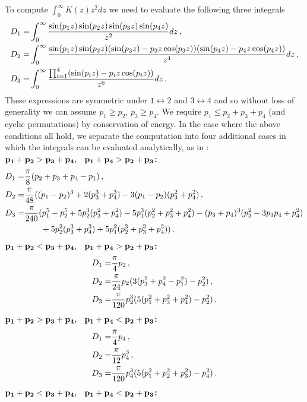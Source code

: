 To compute $\int_0^\infty K(z) z^2 dz$ we need to evaluate the following three integrals
\begin{align}
D_1=&\int_0^\infty \frac{\sin(p_1z)\sin(p_2z)\sin(p_3z)\sin(p_4z)}{z^2}dz\,,\\
D_2=&\int_0^\infty\frac{\sin(p_1z)\sin(p_2z)(\sin(p_3z)-p_3z\cos(p_3z))(\sin(p_4z)-p_4z\cos(p_4z))}{z^4}dz\,,\notag\\
D_3=&\int_0^\infty\frac{\prod_{i=1}^4(\sin(p_iz)-p_iz\cos(p_iz))}{z^6}dz\,.\notag
\end{align}
These expressions are symmetric under $1\leftrightarrow 2$ and $3\leftrightarrow 4$ and so without loss of generality we can assume $p_1\geq p_2$, $p_3\geq p_4$. We require $p_1\leq p_2+p_3+p_4$ (and cyclic permutations) by conservation of energy.  In the case where the above conditions all hold, we separate the computation into four additional cases in which the integrals can be evaluated analytically, as  in \cite{Dolgov_Hansen}:\\
${\bf p_1+p_2>p_3+p_4\text{, \hspace{1mm} }p_1+p_4>p_2+p_3}${\bf :}
\begin{align}
D_1=&\frac{\pi}{8}(p_2+p_3+p_4-p_1)\,,\\
D_2=&\frac{\pi}{48}((p_1-p_2)^3+2(p_3^3+p_4^3)-3(p_1-p_2)(p_3^2+p_4^2)\,,\notag\\
D_3=&\frac{\pi}{240}(p_1^5-p_2^5+5p_2^3(p_3^2+p_4^2)-5p_1^3(p_2^2+p_3^2+p_4^2)-(p_3+p_4)^3(p_3^2-3p_3p_4+p_4^2)\notag\\
&\hspace{7mm}+5p_2^2(p_3^3+p_4^3)+5p_1^2(p_2^3+p_3^3+p_4^3))\,.\notag
\end{align}
${\bf p_1+p_2<p_3+p_4\text{, \hspace{1mm} }p_1+p_4>p_2+p_3}${\bf :}
\begin{align}
D_1=&\frac{\pi }{4}p_2\,,\\
D_2=&\frac{\pi }{24}p_2(3(p_3^2+p_4^2-p_1^2)-p_2^2)\,,\notag\\
D_3=&\frac{\pi}{120}p_2^3(5(p_1^2+p_3^2+p_4^2)-p_2^2)\,.\notag
\end{align}
${\bf p_1+p_2>p_3+p_4\text{, \hspace{1mm} }p_1+p_4<p_2+p_3}${\bf :}
\begin{align}
D_1=&\frac{\pi }{4}p_4\,,\\
D_2=&\frac{\pi}{12} p_4^3\,,\notag\\
D_3=&\frac{\pi }{120}p_4^3(5(p_1^2+p_2^2+p_3^2)-p_4^2)\,.\notag
\end{align}
${\bf p_1+p_2<p_3+p_4\text{, \hspace{1mm} }p_1+p_4<p_2+p_3}${\bf :}

